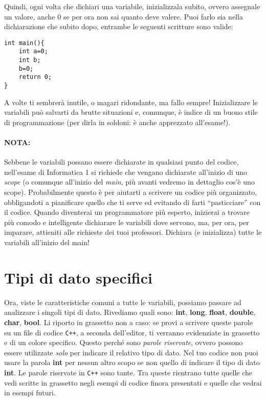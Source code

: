 	Quindi, ogni volta che dichiari una variabile, inizializzala subito, ovvero assegnale un valore, anche 0 se per ora non sai quanto deve valere. Puoi farlo sia nella dichiarazione che subito dopo, entrambe le seguenti scritture sono valide:
	\begin{lstlisting}
int main(){
	int a=0;
	int b;
	b=0;
	return 0;
}
	\end{lstlisting}
	
	A volte ti sembrerà inutile, o magari ridondante, ma fallo sempre! Inizializzare le variabili può salvarti da brutte situazioni e, comunque, è indice di un buono stile di programmazione (per dirla in soldoni: è anche apprezzato all'esame!).
	
	\paragraph{NOTA:}
	Sebbene le variabili possano essere dichiarate in qualsiasi punto del codice, nell'esame di Informatica 1 si richiede che vengano dichiarate all'inizio di uno \emph{scope} (o comunque all'inizio del \emph{main}, più avanti vedremo in dettaglio cos'è uno scope). Probabilmente questo è per aiutarti a scrivere un codice più organizzato, obbligandoti a pianificare quello che ti serve ed evitando di farti ``pasticciare'' con il codice. Quando diventerai un programmatore più esperto, inizierai a trovare più comodo e intelligente dichiarare le variabili dove servono, ma, per ora, per imparare, attieniti alle richieste dei tuoi professori. Dichiara (e inizializza) tutte le variabili all'inizio del main!
	
	\section{Tipi di dato specifici}
	Ora, viste le caratteristiche comuni a tutte le variabili, possiamo passare ad analizzare i singoli tipi di dato. Rivediamo quali sono: \textbf{int}, \textbf{long}, \textbf{float}, \textbf{double}, \textbf{char}, \textbf{bool}. Li riporto in grassetto non a caso: se provi a scrivere queste parole su un file di codice \verb|C++|, a seconda dell'editor, ti verranno evidenziate in grassetto e di un colore specifico. Questo perché sono \emph{parole riservate}, ovvero possono essere utilizzate \emph{solo} per indicare il relativo tipo di dato. Nel tuo codice non puoi usare la parola \textbf{int} per nessun altro scopo se non quello di indicare il tipo di dato \textbf{int}. Le parole riservate in \verb|C++| sono tante. Tra queste rientrano tutte quelle che vedi scritte in grassetto negli esempi di codice finora presentati e quelle che vedrai in esempi futuri.
	
